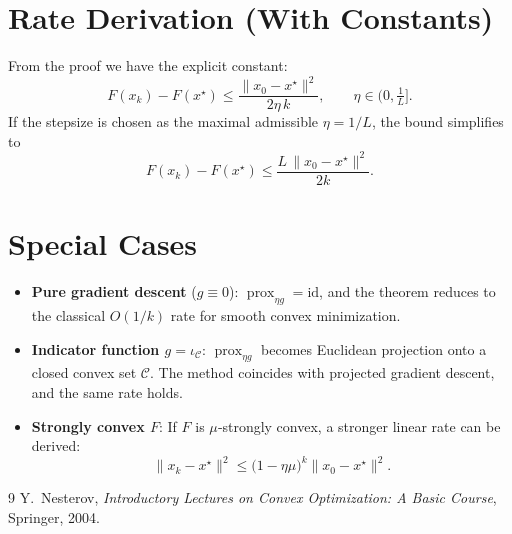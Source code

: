 \documentclass{article}
\newcommand{\prox}{\operatorname{prox}}
\begin{document}
\section*{Rate Derivation (With Constants)}
From the proof we have the explicit constant:
\[
F(x_k)-F(x^\star)\le \frac{\|x_0-x^\star\|^2}{2\eta\,k},
\qquad \eta\in\bigl(0,\tfrac1L\bigr].
\]
If the stepsize is chosen as the maximal admissible $\eta=1/L$, the bound simplifies to
\[
F(x_k)-F(x^\star)\le \frac{L\,\|x_0-x^\star\|^2}{2k}.
\]

\section*{Special Cases}
\begin{itemize}[noitemsep]
\item \textbf{Pure gradient descent} ($g\equiv0$): $\prox_{\eta g}=\text{id}$, and the theorem reduces to the classical $O(1/k)$ rate for smooth convex minimization.
\item \textbf{Indicator function $g=\iota_{\mathcal{C}}$}: $\prox_{\eta g}$ becomes Euclidean projection onto a closed convex set $\mathcal{C}$. The method coincides with projected gradient descent, and the same rate holds.
\item \textbf{Strongly convex $F$}: If $F$ is $\mu$‑strongly convex, a stronger linear rate can be derived:
\[
\|x_k-x^\star\|^2\le\bigl(1-\eta\mu\bigr)^k\|x_0-x^\star\|^2 .
\]
\end{itemize}

\begin{thebibliography}{9}
Y.~Nesterov,
\textit{Introductory Lectures on Convex Optimization: A Basic Course},
Springer, 2004.
\end{thebibliography}
\end{document}

